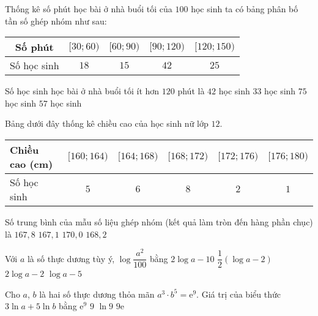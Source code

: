 %

\begin{ex}%
	Thống kê số phút học bài ở nhà buổi tối của $100$ học sinh ta có bảng phân bố tần số ghép nhóm như sau:
	\begin{center}
		\begin{tabular}{|c|c|c|c|c|}
			\hline Số phút & {$[30 ; 60)$} & {$[60 ; 90)$} & {$[90 ; 120)$} & {$[120 ; 150)$} \\
			\hline Số học sinh & $18$ & $15$ & $42$ & $25$ \\
			\hline
		\end{tabular}
	\end{center}
	Số học sinh học bài ở nhà buổi tối ít hơn $120$ phút là
	\choice
	{$42$ học sinh}
	{$33$ học sinh}
	{\True $75$ học sinh}
	{$57$ học sinh}
\end{ex}

\begin{ex}%
	Bảng dưới đây thống kê chiều cao của học sinh nữ lớp $12$.
	\begin{center}
		\begin{tabular}{|l|c|c|c|c|c|}
			\hline Chiều cao (cm) &{$[160 ; 164)$}&{$[164 ; 168)$}&{$[168 ; 172)$}&{$[172 ; 176)$}&{$[176 ; 180)$}\\
			\hline Số học sinh & $5$ & $6$ & $8$ & $2$ & $1$ \\
			\hline
		\end{tabular}
	\end{center}
	Số trung bình của mẫu số liệu ghép nhóm (kết quả làm tròn đến hàng phần chục) là
	\choice
	{\True $167{,}8$}
	{$167{,}1$}
	{$170{,}0$}
	{$168{,}2$}
\end{ex}

\begin{ex}%
	Với $a$ là số thực dương tùy ý, $\log \dfrac{a^2}{100}$ bằng
	\choice
	{$2\log a-10$}
	{$\dfrac{1}{2}(\log a-2)$}
	{\True$2\log a-2$}
	{$\log a-5$}
\end{ex}

\begin{ex}%
	Cho $a$, $b$ là hai số thực dương thỏa mãn $a^{3}\cdot b^{5}=\mathrm{e}^{9}$. Giá trị của biểu thức $3\ln a+5 \ln b$ bằng
	\choice
	{$\mathrm{e}^{9}$}
	{\True $9$}
	{$\ln 9$}
	{$9\mathrm{e}$}
\end{ex}

